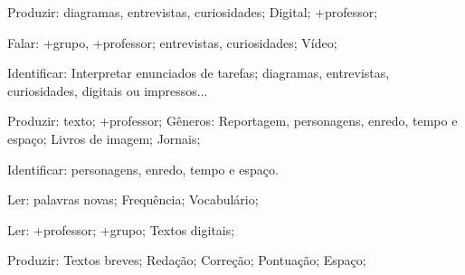  Produzir: diagramas, entrevistas, curiosidades; Digital; +professor;

 Falar: +grupo, +professor; entrevistas, curiosidades; Vídeo;

 Identificar: Interpretar enunciados de tarefas; diagramas, entrevistas, curiosidades, digitais ou impressos... 

 Produzir: texto; +professor; Gêneros: Reportagem, personagens, enredo, tempo e espaço; Livros de imagem; Jornais;

 Identificar: personagens, enredo, tempo e espaço.

 Ler: palavras novas; Frequência; Vocabulário;

 Ler: +professor; +grupo; Textos digitais;

 Produzir: Textos breves; Redação; Correção; Pontuação; Espaço;

